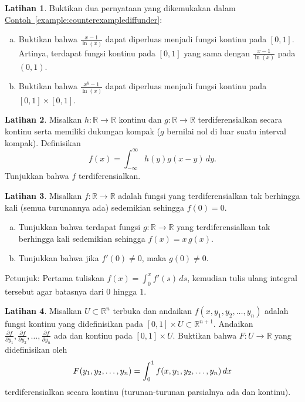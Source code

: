 \documentclass[12pt,openany]{book}
\newcommand{\avoidbreak}{\postdisplaypenalty=100}
\newcommand{\R}{{\mathbb{R}}}
\theoremstyle{plain}
\theoremstyle{remark}
\theoremstyle{definition}
\newenvironment{exbox}{%
    \def\FrameCommand{\vrule width 1pt \relax\hspace{10pt}}%
    \MakeFramed{\advance\hsize-\width\FrameRestore}%
}{%
    \endMakeFramed
}
\newenvironment{exparts}{%
    \leavevmode\begin{enumerate}[a),noitemsep,topsep=0pt,parsep=0pt,partopsep=0pt]
}{%
    \end{enumerate}
}
\theoremstyle{exercise}
\newtheorem{exercise}{Latihan}[section]
\theoremstyle{example}
\newcommand{\exampleref}[1]{\hyperref[#1]{Contoh~\ref*{#1}}}
\begin{document}
\begin{exbox}
\begin{exercise} \label{exercise:counterexamplediffunder}
Buktikan dua pernyataan yang dikemukakan dalam
\exampleref{example:counterexamplediffunder}:
\begin{exparts}
\item
Buktikan bahwa $\frac{x-1}{\ln(x)}$ dapat diperluas menjadi fungsi kontinu pada
$[0,1]$.  Artinya, terdapat fungsi kontinu pada $[0,1]$
yang sama dengan $\frac{x-1}{\ln(x)}$ pada $(0,1)$.
\item
Buktikan bahwa $\frac{x^y-1}{\ln(x)}$ dapat diperluas menjadi fungsi kontinu
pada $[0,1] \times [0,1]$.
\end{exparts}
\end{exercise}

\begin{exercise}
Misalkan $h \colon \R \to \R$ kontinu dan $g
\colon \R \to \R$ terdiferensialkan secara kontinu serta memiliki dukungan
kompak ($g$ bernilai nol di luar suatu interval kompak).  Definisikan
\begin{equation*}
f(x) = \int_{-\infty}^\infty h(y)g(x-y) \, dy  .
\end{equation*}
Tunjukkan bahwa $f$ terdiferensialkan.
\end{exercise}

\begin{exercise}
Misalkan $f \colon \R \to \R$ adalah fungsi yang terdiferensialkan tak berhingga kali (semua turunannya ada)
sedemikian sehingga $f(0) = 0$.
\begin{exparts}
\item
Tunjukkan bahwa terdapat fungsi $g \colon \R \to \R$ yang terdiferensialkan
tak berhingga kali sedemikian sehingga $f(x) = x\,g(x)$.
\item
Tunjukkan bahwa
jika $f'(0) \neq 0$, maka $g(0) \neq 0$.
\end{exparts}
Petunjuk: Pertama tuliskan
$f(x) = \int_0^x f'(s) \,ds$, kemudian tulis ulang integral tersebut agar batasnya
dari $0$ hingga $1$.
\end{exercise}

\begin{exercise}%
\label{exercise:severalvariableLeibniz}
Misalkan $U \subset \R^n$ terbuka dan andaikan
$f(x,y_1,y_2,\ldots,y_n)$ adalah fungsi kontinu
yang didefinisikan pada $[0,1] \times U \subset \R^{n+1}$.
Andaikan
$\frac{\partial f}{\partial y_1},
\frac{\partial f}{\partial y_2},\ldots,
\frac{\partial f}{\partial y_n}$
ada dan kontinu pada $[0,1] \times U$.
Buktikan bahwa $F \colon U \to \R$ yang didefinisikan oleh
\begin{equation*}
F(y_1,y_2,\ldots,y_n) =
\int_0^1
f(x,y_1,y_2,\ldots,y_n)
\, dx
\avoidbreak
\end{equation*}
terdiferensialkan secara kontinu (turunan-turunan parsialnya ada dan
kontinu).
\end{exercise}


\end{exbox}
\end{document}

